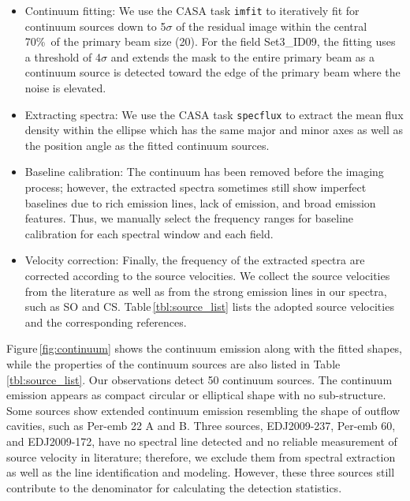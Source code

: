 \documentclass[twocolumn]{aastex62}
\begin{document}
\begin{itemize}
  \item Continuum fitting: We use the CASA task \texttt{imfit} to iteratively fit for continuum sources down to 5$\sigma$ of the residual image within the central 70\%\ of the primary beam size (20\arcsec).  For the field Set3\_ID09, the fitting uses a threshold of 4$\sigma$ and extends the mask to the entire primary beam as a continuum source is detected toward the edge of the primary beam where the noise is elevated.
  \item Extracting spectra:  We use the CASA task \texttt{specflux} to extract the mean flux density within the ellipse which has the same major and minor axes as well as the position angle as the fitted continuum sources.
  \item Baseline calibration:  The continuum has been removed before the imaging process; however, the extracted spectra sometimes still show imperfect baselines due to rich emission lines, lack of emission, and broad emission features.  Thus, we manually select the frequency ranges for baseline calibration for each spectral window and each field.
  \item Velocity correction:  Finally, the frequency of the extracted spectra are corrected according to the source velocities.  We collect the source velocities from the literature as well as from the strong emission lines in our spectra, such as SO and CS.  Table\,\ref{tbl:source_list} lists the adopted source velocities and the corresponding references.
\end{itemize}

Figure\,\ref{fig:continuum} shows the continuum emission along with the fitted shapes, while the properties of the continuum sources are also listed in Table\,\ref{tbl:source_list}.  Our observations detect 50 continuum sources.    The continuum emission appears as compact circular or elliptical shape with no sub-structure.  Some sources show extended continuum emission resembling the shape of outflow cavities, such as Per-emb 22 A and B.  Three sources, EDJ2009-237, Per-emb 60, and EDJ2009-172, have no spectral line detected and no reliable measurement of source velocity in literature; therefore, we exclude them from spectral extraction as well as the line identification and modeling.  However, these three sources still contribute to the denominator for calculating the detection statistics.
\end{document}
